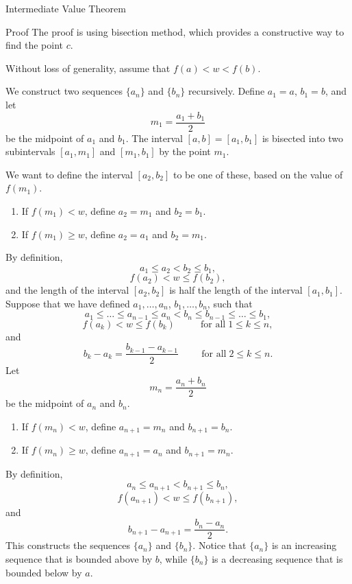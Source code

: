 \begin{example}
\begin{theorem}{Intermediate Value Theorem}
\end{theorem}


\begin{myproof}{Proof}
The proof is using bisection method, which provides a constructive way to find the point $c$. 

Without loss of generality, assume that $f(a)<w<f(b)$.

We construct two sequences $\{a_n\}$ and $\{b_n\}$ recursively. Define $a_1=a$, $b_1=b$, and let
\[m_1=\frac{a_1+b_1}{2}\] be the midpoint of $a_1$ and $b_1$. The interval $[a,b]=[a_1, b_1]$ is bisected into two  subintervals $[a_1, m_1]$ and $[m_1, b_1]$ by the point $m_1$. 

 We want to define the interval $[a_2, b_2]$ to be one of these, based on the value of $f(m_1)$. 
\begin{enumerate}[$\bullet$\;\;]\item
If $f(m_1)<w$, define $a_2=m_1$ and $b_2=b_1$.
 \item If $f(m_1)\geq w$, define $a_2=a_1$ and $b_2=m_1$.
 
 \end{enumerate}By  definition,
 \[a_1\leq a_2<b_2\leq b_1,\]
 \[f(a_2)<w\leq f(b_2),\] and  the length of the interval $[a_2, b_2]$ is half the length of the interval $[a_1, b_1]$. 
 \bp
 Suppose that we have defined $a_1, \ldots, a_n$, $b_1, \ldots, b_n$, such that
 \[a_1\leq   \ldots \leq a_{n-1}\leq a_n<b_n\leq b_{n-1}\leq \ldots \leq b_1,\]
 \[f(a_k)<w\leq f(b_k)\hspace{1cm}\;\text{for all}\;1\leq k\leq n,\]
 and
 \[b_k-a_k=\frac{b_{k-1}-a_{k-1}}{2} \hspace{1cm} \text{for all}\;2\leq k\leq n.\]
 Let
 \[m_n=\frac{a_n+b_n}{2}\]  be the midpoint of $a_n$ and $b_n$.
 \begin{enumerate}[$\bullet$\;\;]\item
If $f(m_n)<w$, define $a_{n+1}=m_n$ and $b_{n+1}=b_n$.
 \item If $f(m_n)\geq w$, define $a_{n+1}=a_n$ and $b_{n+1}=m_n$.
 
 \end{enumerate}  By   definition,
 \[a_n\leq a_{n+1}<b_{n+1}\leq b_n,\]
 \[f(a_{n+1})<w\leq f(b_{n+1}),\] and  
 \[b_{n+1}-a_{n+1}=\frac{b_n-a_n}{2}.\]
This constructs the sequences $\{a_n\}$ and $\{b_n\}$. Notice that $\{a_n\}$ is an increasing sequence that is bounded above by $b$, while $\{b_n\}$ is a decreasing sequence that is bounded below by $a$.
 

\end{myproof}
\end{example}
